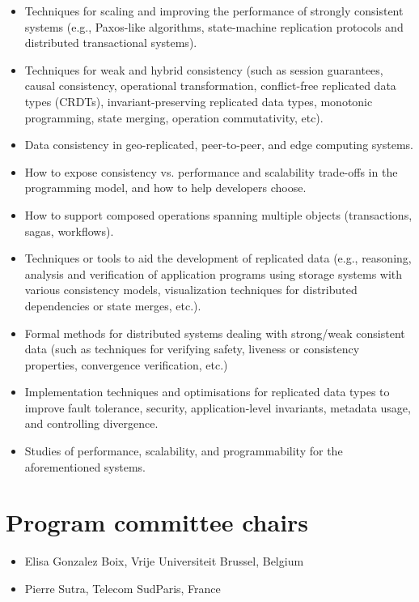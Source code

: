 \documentclass[sigplan,review]{acmart}
\begin{document}
\begin{itemize}
\item Techniques for scaling and improving the performance of strongly consistent systems (e.g., Paxos-like algorithms, state-machine replication protocols and distributed transactional systems).
\item Techniques for weak and hybrid consistency (such as session guarantees, causal consistency, operational transformation, conflict-free replicated data types (CRDTs), invariant-preserving replicated data types, monotonic programming, state merging, operation commutativity, etc).
\item Data consistency in geo-replicated, peer-to-peer, and edge computing systems.
\item How to expose consistency vs. performance and scalability trade-offs in the programming model, and how to help developers choose.
\item How to support composed operations spanning multiple objects (transactions, sagas, workflows).
\item Techniques or tools to aid the development of replicated data (e.g., reasoning, analysis and verification of application programs using storage systems with various consistency models, visualization techniques for distributed dependencies or state merges, etc.).
\item Formal methods for distributed systems dealing with strong/weak consistent data (such as techniques for verifying safety, liveness or consistency properties, convergence verification, etc.) 
\item Implementation techniques and optimisations for replicated data types to improve fault tolerance, security, application-level invariants, metadata usage, and controlling divergence.
\item Studies of performance, scalability, and programmability for the aforementioned systems.
\end{itemize}
  
\section*{Program committee chairs}

\begin{itemize}
\item Elisa Gonzalez Boix, Vrije Universiteit Brussel, Belgium
\item Pierre Sutra, Telecom SudParis, France
\end{itemize}
\end{document}

